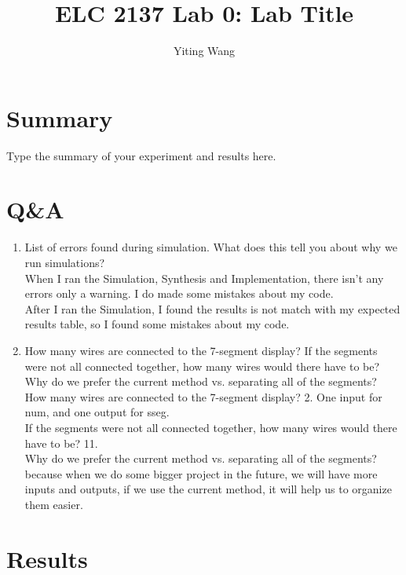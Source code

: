 \documentclass[11pt]{article}
\begin{document}
\title{ELC 2137 Lab 0: Lab Title}
\author{Yiting Wang}

\maketitle


\section*{Summary}

Type the summary of your experiment and results here.  


\section*{Q\&A}

\begin{enumerate}
	\item List of errors found during simulation. What does this tell you about why we run simulations?\\
	When I ran the Simulation, Synthesis and Implementation, there isn't any errors only a warning. I do made some mistakes about my code. \\
	After I ran the Simulation, I found the results is not match with my  expected results table, so I found some mistakes about my code.\\
	\item How many wires are connected to the 7-segment display? If the segments were not all connected together, how many wires would there have to be? Why do we prefer the current method  vs. separating all of the segments?\\
	How many wires are connected to the 7-segment display? 2. One input for num, and one output for sseg.\\ 
	If the segments were not all connected together, how many wires would there have to be? 11. \\
	Why do we prefer the current method  vs. separating all of the segments? because when we do some bigger project in the future, we will have more inputs and outputs, if we use the current method, it will help us to organize them easier.\\
\end{enumerate}




\section*{Results}
	
\end{document}
